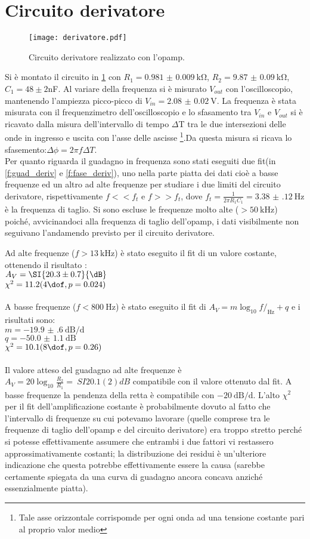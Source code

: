 \section{Circuito derivatore}
\begin{figure}[h]
	\centering
	\texttt{[image: derivatore.pdf]}
	\caption{Circuito derivatore realizzato con l'opamp.}
	\label{f:derivatore}
\end{figure}
Si è montato il circuito in \ref{f:derivatore} con $R_1= \SI{0.981(9)}{\kohm}$, $R_2= \SI{9.87(9)}{\kohm}$,$C_1= 48\pm2$nF. Al variare della frequenza si è misurato $V_{out}$ con l'oscilloscopio, mantenendo l'ampiezza picco-picco di $V_{in}=\SI{2.08(2)}{\V}$. La frequenza è stata misurata con il frequenzimetro dell'oscilloscopio e lo sfasamento tra $V_{in}$ e $V_{out}$ si è ricavato dalla misura dell'intervallo di tempo $\Delta$T tra le due intersezioni delle onde in ingresso e uscita con l'asse delle ascisse \footnote{Tale asse orizzontale corrispomde per ogni onda ad una tensione costante pari al proprio valor medio}.Da questa misura si ricava lo sfasemento:$ \Delta\phi = 2\pi f\Delta T$.\\
Per quanto riguarda il guadagno in frequenza sono stati eseguiti due fit(in \ref{f:guad_deriv} e \ref{f:fase_deriv}), uno nella parte piatta dei dati cioè a basse frequenze ed un altro ad alte frequenze per studiare i due limiti del circuito derivatore, rispettivamente $f<<f_t$ e $f>>f_t$, dove  $f_t=\frac{1}{2\pi R_1C_1}= \SI{3.38(12)}{\Hz}$ è la frequenza di taglio. Si sono escluse le frequenze molto alte ($>\SI{50}{\kHz}$) poiché, avvicinandoci alla frequenza di taglio dell'opamp, i dati visibilmente non seguivano l'andamendo previsto per il circuito derivatore.

Ad alte frequenze ($f > \SI{13}{\kHz}$) è stato eseguito il fit di un valore costante, ottenendo il risultato :\\
$A_V= \SI{20.3 \pm 0.7}{\dB}$\\
$\chi^2=11.2 (4 \dof, p = 0.024)$\\
\\
A basse frequenze ($f< \SI{800}{\Hz}$) è stato eseguito il fit di  $A_V= m\log_{10} f/_{\si{\Hz}} +q$  e i risultati sono:\\
$m= \SI{-19.9(6)}{\dB\per\deca}$\\
$q= \SI{-50.0(11)}{\dB}$\\
$\chi^2=10.1 (8 \dof, p = 0.26)$\\
\\
Il valore atteso del guadagno ad alte frequenze è $A_V=20\log_{10} \frac{R_2}{R_1}= \ SI{20.1(2)}{dB}$ compatibile con il valore ottenuto dal fit.
A basse frequenze la pendenza della retta è compatibile con $\SI{-20}{\dB\per\deca}$.
L'alto $\chi^2$ per il fit dell'amplificazione costante è probabilmente dovuto al fatto che l'intervallo di frequenze su cui potevamo lavorare (quelle comprese tra le frequenze di taglio dell'opamp e del circuito derivatore) era troppo stretto perché si potesse effettivamente assumere che entrambi i due fattori vi restassero approssimativamente costanti; la distribuzione dei residui è un'ulteriore indicazione che questa potrebbe effettivamente essere la causa (sarebbe certamente spiegata da una curva di guadagno ancora concava anziché essenzialmente piatta).

